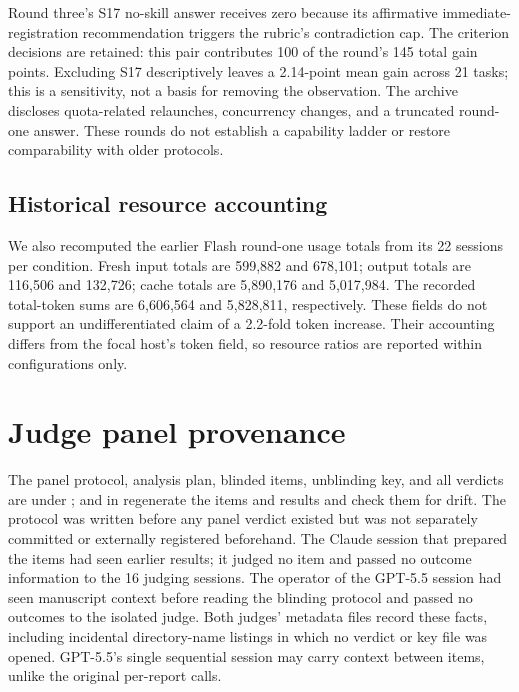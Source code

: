 \documentclass[11pt]{article}
\begin{document}
Round three's S17 no-skill answer receives zero because its affirmative immediate-registration recommendation triggers the rubric's contradiction cap. The criterion decisions are retained: this pair contributes 100 of the round's 145 total gain points. Excluding S17 descriptively leaves a 2.14-point mean gain across 21 tasks; this is a sensitivity, not a basis for removing the observation. The archive discloses quota-related relaunches, concurrency changes, and a truncated round-one answer. These rounds do not establish a capability ladder or restore comparability with older protocols.

\subsection{Historical resource accounting}
We also recomputed the earlier Flash round-one usage totals from its 22 sessions per condition. Fresh input totals are 599,882 and 678,101; output totals are 116,506 and 132,726; cache totals are 5,890,176 and 5,017,984. The recorded total-token sums are 6,606,564 and 5,828,811, respectively. These fields do not support an undifferentiated claim of a 2.2-fold token increase. Their accounting differs from the focal host's token field, so resource ratios are reported within configurations only.

\section{Judge panel provenance}\label{app:panel}
The panel protocol, analysis plan, blinded items, unblinding key, and all verdicts are under ;  and  in  regenerate the items and results and check them for drift. The protocol was written before any panel verdict existed but was not separately committed or externally registered beforehand. The Claude session that prepared the items had seen earlier results; it judged no item and passed no outcome information to the 16 judging sessions. The operator of the GPT-5.5 session had seen manuscript context before reading the blinding protocol and passed no outcomes to the isolated judge. Both judges' metadata files record these facts, including incidental directory-name listings in which no verdict or key file was opened. GPT-5.5's single sequential session may carry context between items, unlike the original per-report calls.
\end{document}
